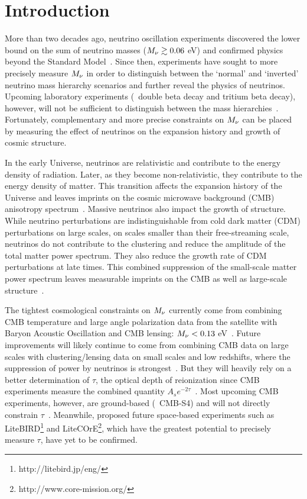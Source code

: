 \section{Introduction} \label{sec:intro}
More than two decades ago, neutrino oscillation experiments discovered the lower
bound on the sum of neutrino masses ($M_\nu \gtrsim 0.06$ eV) and confirmed
physics beyond the Standard Model~\citep{fukuda1998, forero2014, gonzalez-garcia2016}. 
Since then, experiments have sought to more precisely measure $M_\nu$ in order
to distinguish between the `normal' and `inverted' neutrino mass hierarchy
scenarios and further reveal the physics of neutrinos. Upcoming laboratory 
experiments (\eg~double beta decay and tritium beta decay), however, will not
be sufficient to distinguish between the mass hierarchies~\citep{bonn2011, drexlin2013}.
Fortunately, complementary and more precise constraints on $M_\nu$ can be
placed by measuring the effect of neutrinos on the expansion history and growth
of cosmic structure. 

In the early Universe, neutrinos are relativistic and contribute to the 
energy density of radiation. Later, as they become non-relativistic, 
they contribute to the energy density of matter. This transition affects 
the expansion history of the Universe and leaves imprints on the cosmic
microwave background (CMB) anisotropy spectrum~\citep{lesgourgues2012,
lesgourgues2014}. Massive neutrinos also impact the growth of structure. 
While neutrino perturbations are indistinguishable from cold dark matter (CDM)
perturbations on large scales, on scales smaller than their free-streaming
scale, neutrinos do not contribute to the clustering and reduce the 
amplitude of the total matter power spectrum. They also reduce the growth 
rate of CDM perturbations at late times. This combined suppression of 
the small-scale matter power spectrum leaves measurable imprints 
on the CMB as well as large-scale structure~\citep[for further details see][]{lesgourgues2012, lesgourgues2014, gerbino2018}. 

The tightest cosmological constraints on $M_\nu$ currently come from 
combining CMB temperature and large angle polarization data from the 
\planck satellite with Baryon Acoustic Oscillation and CMB lensing: 
$M_\nu < 0.13$ eV~\citep{planckcollaboration2018}. Future improvements
will likely continue to come from combining CMB data on large scales 
with clustering/lensing data on small scales and low redshifts, where 
the suppression of power by neutrinos is strongest~\citep{brinckmann2019}. 
But they will heavily rely on a better determination of $\tau$, the optical
depth of reionization since CMB experiments measure the combined quantity $A_s
e^{-2\tau}$~\citep{allison2015, liu2016, archidiacono2017}.
Most upcoming CMB experiments, however, are ground-based (\eg~CMB-S4) and 
will not directly constrain $\tau$~\citep{abazajian2016}. Meanwhile, proposed
future space-based experiments such as
LiteBIRD\footnote{http://litebird.jp/eng/} and 
LiteCOrE\footnote{http://www.core-mission.org/}, which have the greatest 
potential to precisely measure $\tau$, have yet to be confirmed. 

